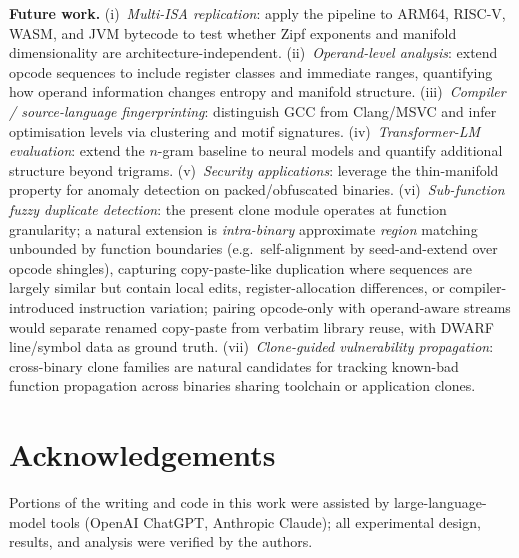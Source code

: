 \documentclass[conference]{IEEEtran}
\begin{document}
\textbf{Future work.}
(i)~\emph{Multi-ISA replication}: apply the pipeline to ARM64, RISC-V,
WASM, and JVM bytecode to test whether Zipf exponents and manifold
dimensionality are architecture-independent.
(ii)~\emph{Operand-level analysis}: extend opcode sequences to include
register classes and immediate ranges, quantifying how operand
information changes entropy and manifold structure.
(iii)~\emph{Compiler / source-language fingerprinting}: distinguish GCC
from Clang/MSVC and infer optimisation levels via clustering and motif
signatures.
(iv)~\emph{Transformer-LM evaluation}: extend the $n$-gram baseline to
neural models and quantify additional structure beyond trigrams.
(v)~\emph{Security applications}: leverage the thin-manifold property
for anomaly detection on packed/obfuscated binaries.
(vi)~\emph{Sub-function fuzzy duplicate detection}: the present clone
module operates at function granularity; a natural extension is
\emph{intra-binary} approximate \emph{region} matching unbounded by
function boundaries (e.g.\ self-alignment by seed-and-extend over opcode
shingles), capturing copy-paste-like duplication where sequences are
largely similar but contain local edits, register-allocation differences,
or compiler-introduced instruction variation; pairing opcode-only with
operand-aware streams would separate renamed copy-paste from verbatim
library reuse, with DWARF line/symbol data as ground truth.
(vii)~\emph{Clone-guided vulnerability propagation}: cross-binary clone
families are natural candidates for tracking known-bad function
propagation across binaries sharing toolchain or application clones.

\section*{Acknowledgements}
Portions of the writing and code in this work were assisted by
large-language-model tools (OpenAI ChatGPT, Anthropic Claude); all
experimental design, results, and analysis were verified by the
authors.



\end{document}
